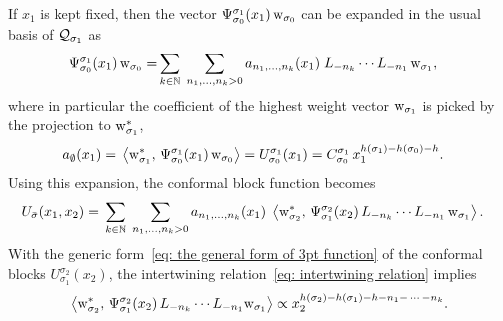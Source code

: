 \documentclass[oneside,english]{amsart}
\numberwithin{equation}{section}
\numberwithin{figure}{section}
\theoremstyle{plain}
\theoremstyle{plain}
\theoremstyle{plain}
\theoremstyle{remark}
\theoremstyle{plain}
\theoremstyle{plain}
\theoremstyle{plain}
\theoremstyle{plain}
\theoremstyle{plain}
\theoremstyle{plain}
\theoremstyle{plain}
\theoremstyle{plain}
\newcommand{\blue}[1]{{\color{blue} #1}}
\begin{document}
If $x_{1}$ is kept fixed, then the vector $\Psi_{\sigma_{0}}^{\sigma_{1}}(x_{1})\,\mathrm{w}_{\sigma_{0}}$
can be expanded in the usual basis of $\mathcal{Q}_{\sigma_{1}}$ as
\begin{align*}
\Psi_{\sigma_{0}}^{\sigma_{1}}(x_{1})\,\mathrm{w}_{\sigma_{0}}
    = & \sum_{k \in \mathbb{N}} \; \sum_{n_{1},\ldots,n_{k}>0} a_{n_{1},\ldots,n_{k}}(x_{1}) \; L_{-n_{k}}\cdots L_{-n_{1}}\,\mathrm{w}_{\sigma_{1}},
\end{align*}
where in particular the coefficient of the highest weight vector $\mathrm{w}_{\sigma_{1}}$
is picked by the projection to $\mathrm{w}_{\sigma_{1}}^{*}$,
\begin{align*}
a_{\emptyset}(x_{1})=\; & \left\langle  \mathrm{w}_{\sigma_{1}}^{*} , \, \Psi_{\sigma_{0}}^{\sigma_{1}}(x_{1})\,\mathrm{w}_{\sigma_{0}}  \right\rangle
    = U_{\sigma_{0}}^{\sigma_{1}}(x_{1}) = C_{\sigma_{0}}^{\sigma_{1}}\,x_{1}^{h(\sigma_{1})-h(\sigma_{0})-h}.
\end{align*}
Using this expansion, the conformal block function becomes
\begin{align*}
U_{\bar{\sigma}}(x_{1},x_{2})
    =\; & \sum_{k \in \mathbb{N}} \; \sum_{n_{1},\ldots,n_{k}>0} a_{n_{1},\ldots,n_{k}}(x_{1})\;\left\langle  \mathrm{w}_{\sigma_{2}}^{*} , \, \Psi_{\sigma_{1}}^{\sigma_{2}}(x_{2})\,L_{-n_{k}}\cdots L_{-n_{1}}\,\mathrm{w}_{\sigma_{1}}  \right\rangle.
\end{align*}
With the generic form~\eqref{eq: the general form of 3pt function} of the conformal blocks $U_{\sigma_{1}}^{\sigma_{2}}(x_{2})$,
the intertwining relation~\eqref{eq: intertwining relation} implies
\begin{align*}
\left\langle  \mathrm{w}_{\sigma_{2}}^{*} , \, \Psi_{\sigma_{1}}^{\sigma_{2}}(x_{2})\,L_{-n_{k}}\cdots L_{-n_{1}}\mathrm{w}_{\sigma_{1}}  \right\rangle 
\propto x_{2}^{h(\sigma_{2}) - h(\sigma_{1}) - h - n_{1} - \, \cdots \, - n_k} .
\end{align*}
\end{document}
